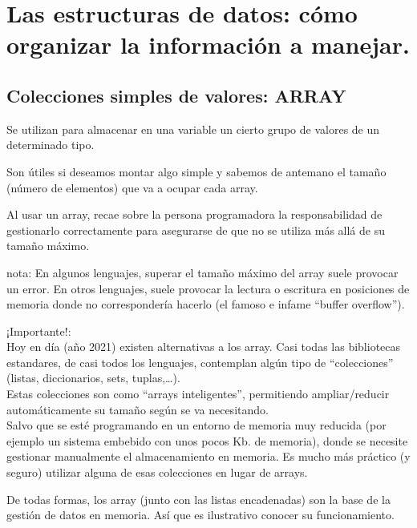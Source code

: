 \documentclass[spanish,12pt,a4paper,final,oneside]{book}
\begin{document}
 


\chapter{Las estructuras de datos: cómo organizar la información a manejar.}

\section{Colecciones simples de valores: ARRAY}
Se utilizan para almacenar en una variable un cierto grupo de valores de un determinado tipo.

Son útiles si deseamos montar algo simple y sabemos de antemano el tamaño (número de elementos) que va a ocupar cada array.

Al usar un array, recae sobre la persona programadora la responsabilidad de gestionarlo correctamente para asegurarse de que no se utiliza más allá de su tamaño máximo. 

nota: En algunos lenguajes, superar el tamaño máximo del array suele provocar un error. En otros lenguajes, suele provocar la lectura o escritura en posiciones de memoria donde no correspondería hacerlo (el famoso e infame ``buffer overflow'').

¡Importante!: 
\\Hoy en día (año 2021) existen alternativas a los array. Casi todas las bibliotecas estandares, de casi todos los lenguajes, contemplan algún tipo de ``colecciones'' (listas, diccionarios, sets, tuplas,\ldots).
\\ Estas colecciones son como  ``arrays inteligentes'', permitiendo ampliar/reducir automáticamente su tamaño según se va necesitando.
\\ Salvo que se esté programando en un entorno de memoria muy reducida (por ejemplo un sistema embebido con unos pocos Kb. de memoria), donde se necesite gestionar manualmente el almacenamiento en memoria. Es mucho más práctico (y seguro) utilizar alguna de esas colecciones en lugar de arrays.

De todas formas, los array (junto con las listas encadenadas) son la base de la gestión de datos en memoria. Así que es ilustrativo conocer su funcionamiento.
\end{document}
